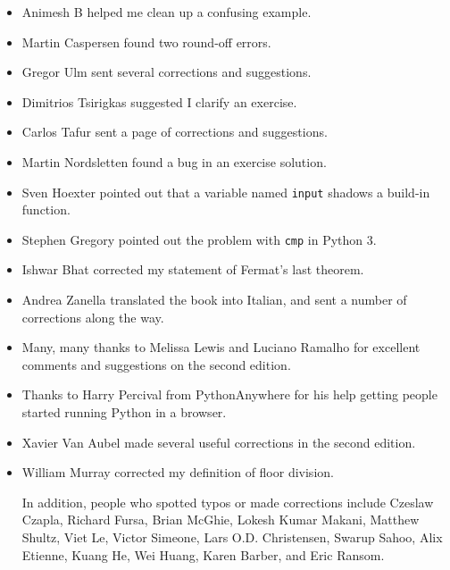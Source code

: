 \documentclass[10pt]{book}
\begin{document}
\begin{itemize}
\item Animesh B helped me clean up a confusing example.

\item Martin Caspersen found two round-off errors.

\item Gregor Ulm sent several corrections and suggestions.

\item Dimitrios Tsirigkas suggested I clarify an exercise.

\item Carlos Tafur sent a page of corrections and suggestions.

\item Martin Nordsletten found a bug in an exercise solution.

\item Sven Hoexter pointed out that a variable named {\tt input}
shadows a build-in function.

\item Stephen Gregory pointed out the problem with {\tt cmp}
in Python 3.

\item Ishwar Bhat corrected my statement of Fermat's last theorem.

\item Andrea Zanella translated the book into Italian, and sent a
number of corrections along the way.

\item Many, many thanks to Melissa Lewis and Luciano Ramalho for
  excellent comments and suggestions on the second edition.

\item Thanks to Harry Percival from PythonAnywhere for his help
getting people started running Python in a browser.

\item Xavier Van Aubel made several useful corrections in the second
edition.

\item William Murray corrected my definition of floor division.


In addition, people who spotted typos or made corrections include
Czeslaw Czapla,
Richard Fursa, Brian McGhie, Lokesh Kumar Makani, Matthew Shultz, Viet
Le, Victor Simeone, Lars O.D. Christensen, Swarup Sahoo, Alix Etienne,
Kuang He, Wei Huang, Karen Barber, and Eric Ransom.




\end{itemize}
\end{document}
